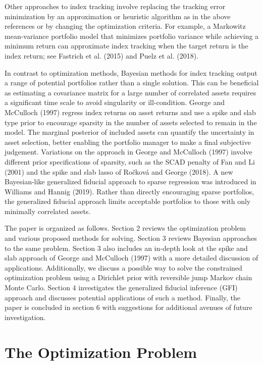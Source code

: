 \documentclass[a4paper, 12pt]{article}
\theoremstyle{plain}
\theoremstyle{definition}
\theoremstyle{remark}
\begin{document}
Other approaches to index tracking involve replacing the tracking error minimization by an approximation or heuristic algorithm as in the above references or by changing the optimization criteria.  For example, a Markowitz mean-variance portfolio model that minimizes portfolio variance while achieving a minimum return can approximate index tracking when the target return is the index return; see Fastrich et al. (2015) and Puelz et al. (2018).

In contrast to optimization methods, Bayesian methods for index tracking output a range of potential portfolios rather than a single solution.  This can be beneficial as estimating a covariance matrix for a large number of correlated assets requires a significant time scale to avoid singularity or ill-condition. George and McCulloch (1997) regress index returns on asset returns and use a spike and slab type prior to encourage sparsity in the number of assets selected to remain in the model.  The marginal posterior of included assets can quantify the uncertainty in asset selection, better enabling the portfolio manager to make a final subjective judgement.  Variations on the approach in George and McCulloch (1997) involve different prior specifications of sparsity, such as the SCAD penalty of Fan and Li (2001) and the spike and slab lasso of Ročková and George (2018).  A new Bayesian-like generalized fiducial approach to sparse regression was introduced in Williams and Hannig (2019).  Rather than directly encouraging sparse portfolios, the generalized fiducial approach limits acceptable portfolios to those with only minimally correlated assets.

The paper is organized as follows. Section 2 reviews the optimization problem and various proposed methods for solving. Section 3 reviews Bayesian approaches to the same problem. Section 3 also includes an in-depth look at the spike and slab approach of George and McCulloch (1997) with a more detailed discussion of applications. Additionally, we discuss a possible way to solve the constrained optimization problem using a Dirichlet prior with reversible jump Markov chain Monte Carlo. Section 4 investigates the generalized fiducial inference (GFI) approach and discusses potential applications of such a method. Finally, the paper is concluded in section 6 with suggestions for additional avenues of future investigation.
       

\section{The Optimization Problem}
\end{document}
